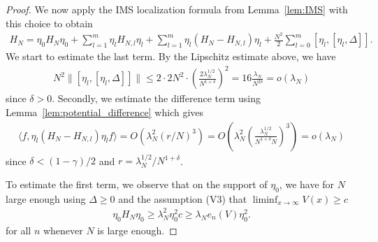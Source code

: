 \documentclass[12pt, reqno]{amsart}
\theoremstyle{definition}
\numberwithin{equation}{section}
\begin{document}
\begin{proof}
    
    We now apply the IMS localization formula from Lemma~\ref{lem:IMS} with this choice  to obtain
    \begin{align*}
        H_N = \eta_0 H_N \eta_0+ \sum_{l=1}^m \eta_l H_{N,l} \eta_l +  \sum_{l=1}^m \eta_l (H_N- H_{N,l}) \eta_l+ \frac{N^2}2\sum_{l=0}^m [\eta_l,[\eta_l,\Delta]].
    \end{align*}
We start to estimate the last term. By the Lipschitz estimate above, we have
    \begin{align*}
        N^2\| [\eta_l,[  \eta_l,\Delta]]\|\leq 2\cdot 2N^2\cdot \left(\frac{2\lambda_N^{1/2}}{N^{1+\delta}}\right)^2=  16\frac{\lambda_N}{N^{2\delta}}=o(\lambda_N)
    \end{align*}
    since $\delta>0$. Secondly, we estimate the difference term using Lemma~\ref{lem:potential_difference} which gives
    \begin{align*}
       \langle f, \eta_l (H_N- H_{N,l}) \eta_l f\rangle = O(\lambda_N^2(r/N)^3) = O\left(\lambda_N^2\left(\frac{\lambda_N^{1/2}}{N^{1+\delta}N}\right)^3\right) = o(\lambda_N)
    \end{align*}
    since $\delta<(1-\gamma)/2$ and $r={\lambda_N^{1/2}}/{N^{1+\delta}} $.

   To estimate the first term, we observe that on the support of $\eta_0$, we have for $N$ large enough using $\Delta\geq0$ and the assumption (V3) that $\liminf_{x\to\infty}V(x)\ge c$
    \begin{align*}
        \eta_0 H_N \eta_0 \geq \lambda_N^2 \eta_0^2 c \geq \lambda_N e_n(V) \eta_0^2.
    \end{align*}
    for all $n$ whenever $N$ is large enough.


\end{proof}
\end{document}
